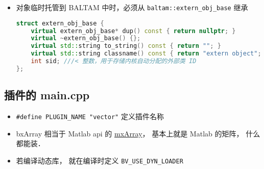 
\begin{issues}
\issueDraft
\end{issues}

\begin{itemize}
\item 对象临时托管到 BALTAM 中时，必须从 \verb|baltam::extern_obj_base| 继承
\begin{lstlisting}[language=cpp, caption=extern\_obj.h节选]
struct extern_obj_base {
    virtual extern_obj_base* dup() const { return nullptr; }
    virtual ~extern_obj_base() {};
    virtual std::string to_string() const { return ""; }
    virtual std::string classname() const { return "extern object"; };
    int sid; ///< 整数，用于存储内核自动分配的外部类 ID
};
\end{lstlisting}
\end{itemize}

\subsection{插件的 main.cpp}
\begin{itemize}
\item \verb|#define PLUGIN_NAME "vector"| 定义插件名称
\item bxArray 相当于 Matlab api 的 \href{https://www.mathworks.com/help/matlab/apiref/mxarray.html}{mxArray}， 基本上就是 Matlab 的矩阵， 什么都能装．
\item 若编译动态库， 就在编译时定义 \verb|BV_USE_DYN_LOADER|
\end{itemize}

